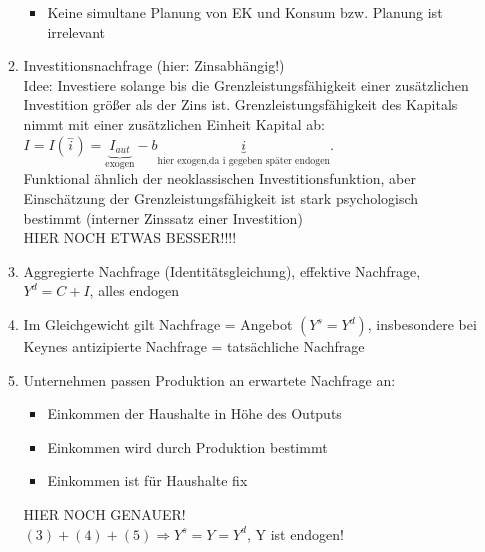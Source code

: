 \documentclass{scrartcl}
\begin{document}
\begin{enumerate}[(a)]
\begin{enumerate}[(1)]
\begin{itemize}
    \item Keine simultane Planung von EK und Konsum bzw. Planung ist irrelevant
  \end{itemize}
  \item Investitionsnachfrage (hier: Zinsabh\"{a}ngig!)\\
  Idee: Investiere solange bis die Grenzleistungsf\"{a}higkeit einer zus\"{a}tzlichen Investition gr\"{o}{\ss}er als der Zins ist. Grenzleistungsf\"{a}higkeit des Kapitals nimmt mit einer zus\"{a}tzlichen Einheit Kapital ab: $I=I(\overset{-}{i})=\underbrace{I_{aut}}_\text{exogen} - b \underbrace{i}_\text{hier exogen,da i gegeben sp\"{a}ter endogen}$.\\
  Funktional \"{a}hnlich der neoklassischen Investitionsfunktion, aber Einsch\"{a}tzung der Grenzleistungsf\"{a}higkeit ist stark psychologisch bestimmt (interner Zinssatz einer Investition)\\
  HIER NOCH ETWAS BESSER!!!!
  \item Aggregierte Nachfrage (Identit\"{a}tsgleichung), effektive Nachfrage, $Y^d = C+I$, alles endogen
  \item Im Gleichgewicht gilt Nachfrage = Angebot $(Y^s=Y^d)$, insbesondere bei Keynes antizipierte Nachfrage = tats\"{a}chliche Nachfrage
  \item Unternehmen passen Produktion an erwartete Nachfrage an:
  \begin{itemize}
    \item Einkommen der Haushalte in H\"{o}he des Outputs
    \item Einkommen wird durch Produktion bestimmt
    \item Einkommen ist f\"{u}r Haushalte fix
  \end{itemize}
  HIER NOCH GENAUER!\\
  $(3)+(4)+(5) \Rightarrow Y^s=Y=Y^d$, Y ist endogen!
\end{enumerate}


\end{enumerate}
\end{document}
